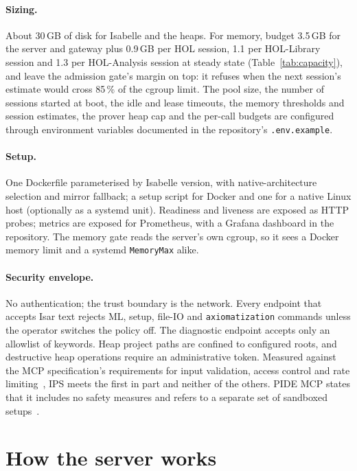 \documentclass[11pt]{article}
\newcommand{\code}[1]{\colorbox{gray!12}{\texttt{\vphantom{Ag}#1}}}
\begin{document}
\paragraph{Sizing.} About 30\,GB of disk for Isabelle and the heaps. For
memory, budget 3.5\,GB for the server and gateway plus 0.9\,GB per HOL
session, 1.1 per HOL-Library session and 1.3 per HOL-Analysis session at
steady state (Table~\ref{tab:capacity}), and leave the admission gate's
margin on top: it refuses when the next session's estimate would cross
85\,\% of the cgroup limit. The pool size, the number of sessions started
at boot, the idle and lease timeouts, the memory thresholds and session
estimates, the prover heap cap and the per-call budgets are configured
through environment variables documented in the repository's
\code{.env.example}.

\paragraph{Setup.} One Dockerfile parameterised by Isabelle version, with
native-architecture selection and mirror fallback; a setup script for
Docker and one for a native Linux host (optionally as a systemd unit).
Readiness and liveness are exposed as HTTP probes; metrics are exposed for
Prometheus, with a Grafana dashboard in the repository. The memory gate
reads the server's own cgroup, so it sees a Docker memory limit and a
systemd \code{MemoryMax} alike.

\paragraph{Security envelope.} No authentication; the trust boundary is
the network. Every endpoint that accepts Isar text rejects ML, setup, file-IO and
\code{axiomatization} commands unless the operator switches the policy
off. The
diagnostic endpoint accepts only an allowlist of keywords. Heap project
paths are confined to configured roots, and destructive heap operations
require an administrative token. Measured against the MCP specification's
requirements for input validation, access control and rate
limiting~\cite{mcp2025spec}, IPS meets the first in part and neither of
the others. PIDE MCP states that it includes no safety measures and refers
to a separate set of sandboxed setups~\cite{schaeffeler2026safe}.

\section{How the server works}
\label{app:code}
\end{document}

